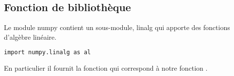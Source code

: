 \subsection{Fonction de bibliothèque}
Le module {\sc numpy} contient un sous-module, {\sc linalg} qui apporte des fonctions d'algèbre linéaire. 
\begin{lstlisting}
import numpy.linalg as al
\end{lstlisting}
En particulier il fournit la fonction  qui correspond à notre fonction .
\newpage
